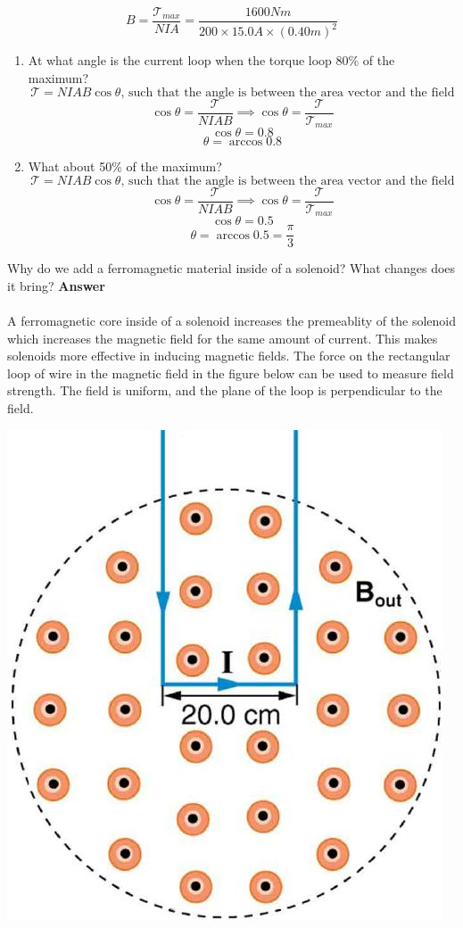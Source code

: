 \documentclass[9pt,addpoints]{exam}
\begin{document}
\begin{questions}
		$$B=\dfrac{\mathcal{T}_{max}}{NIA}=\dfrac{1600Nm}{200\times15.0A\times(0.40m)^2}$$
		\begin{enumerate}[label=(\alph*)]
			\item At what angle is the current loop when the torque loop 80\% of the maximum?
			$$\mathcal{T}=NIAB\cos\theta\text{, such that the angle is between the area vector and the field}$$	
			$$\cos\theta=\dfrac{\mathcal{T}}{NIAB}\implies\cos\theta=\dfrac{\mathcal{T}}{\mathcal{T}_{max}}$$
			$$\cos\theta=0.8$$
			$$\theta=\arccos0.8$$
			\item What about 50\% of the maximum?
			$$\mathcal{T}=NIAB\cos\theta\text{, such that the angle is between the area vector and the field}$$	
			$$\cos\theta=\dfrac{\mathcal{T}}{NIAB}\implies\cos\theta=\dfrac{\mathcal{T}}{\mathcal{T}_{max}}$$
			$$\cos\theta=0.5$$
			$$\theta=\arccos0.5=\dfrac{\pi}{3}$$
		\end{enumerate}
		\question Why do we add a ferromagnetic material inside of a solenoid? What changes does it bring?
		\textbf{Answer} \\ \\
		A ferromagnetic core inside of a solenoid increases the premeablity of the solenoid which increases the magnetic field for the same amount of current. This makes solenoids more effective in inducing magnetic fields.
		\question The force on the rectangular loop of wire in the magnetic field in the figure below can be used to measure field strength. The field is uniform, and the plane of the loop is perpendicular to the field.
		\begin{center}
			\includegraphics[scale=0.3]{loop1}

\end{center}
\end{questions}
\end{document}
